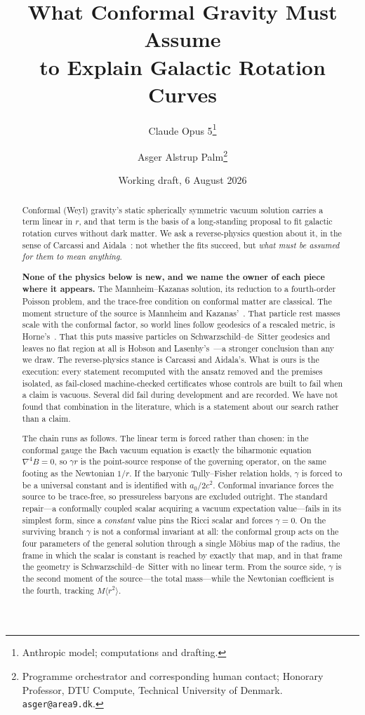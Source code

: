 \documentclass[11pt]{article}
\title{What Conformal Gravity Must Assume\\
\large to Explain Galactic Rotation Curves}
\author{Claude Opus 5\thanks{Anthropic model; computations and drafting.}
\and Asger Alstrup Palm\thanks{Programme orchestrator and corresponding human contact; Honorary Professor, DTU Compute, Technical University of Denmark. \texttt{asger@area9.dk}.}}
\date{Working draft, 6 August 2026}
\theoremstyle{definition}
\theoremstyle{remark}
\begin{document}
\maketitle

\begin{abstract}
Conformal (Weyl) gravity's static spherically symmetric vacuum solution
carries a term linear in \(r\), and that term is the basis of a long-standing
proposal to fit galactic rotation curves without dark matter.  We ask a
reverse-physics question about it, in the sense of Carcassi and
Aidala~\cite{CarcassiAidala2022,AoP}: not whether the fits succeed, but
\emph{what must be assumed for them to mean anything}.

\textbf{None of the physics below is new, and we name the owner of each piece
where it appears.}  The Mannheim--Kazanas solution, its reduction to a
fourth-order Poisson problem, and the trace-free condition on conformal matter
are classical.  The moment structure of the source is Mannheim and
Kazanas'~\cite{MK1994}.  That particle rest masses scale with the conformal
factor, so world lines follow geodesics of a rescaled metric, is
Horne's~\cite{Horne2016}.  That this puts massive particles on
Schwarzschild--de~Sitter geodesics and leaves no flat region at all is Hobson
and Lasenby's~\cite{HobsonLasenby2021,HobsonLasenby2022}---a stronger
conclusion than any we draw.  The reverse-physics stance is Carcassi and
Aidala's.  What is ours is the execution: every statement recomputed with the
ansatz removed and the premises isolated, as fail-closed machine-checked
certificates whose controls are built to fail when a claim is vacuous.
Several did fail during development and are recorded.  We have not found that
combination in the literature, which is a statement about our search rather
than a claim.

The chain runs as follows.  The linear term is forced rather than chosen: in
the conformal gauge the Bach vacuum equation is exactly the biharmonic
equation \(\nabla^{4}B=0\), so \(\gamma r\) is the point-source response of
the governing operator, on the same footing as the Newtonian \(1/r\).  If the
baryonic Tully--Fisher relation holds, \(\gamma\) is forced to be a universal
constant and is identified with \(a_{0}/2c^{2}\).  Conformal invariance forces
the source to be trace-free, so pressureless baryons are excluded outright.
The standard repair---a conformally coupled scalar acquiring a vacuum
expectation value---fails in its simplest form, since a \emph{constant} value
pins the Ricci scalar and forces \(\gamma=0\).  On the surviving branch
\(\gamma\) is not a conformal invariant at all: the conformal group acts on
the four parameters of the general solution through a single M\"obius map of
the radius, the frame in which the scalar is constant is reached by exactly
that map, and in that frame the geometry is Schwarzschild--de~Sitter with no
linear term.  From the source side, \(\gamma\) is the second moment of the
source---the total mass---while the Newtonian coefficient is the fourth,
tracking \(M\langle r^{2}\rangle\).


\end{abstract}
\end{document}
